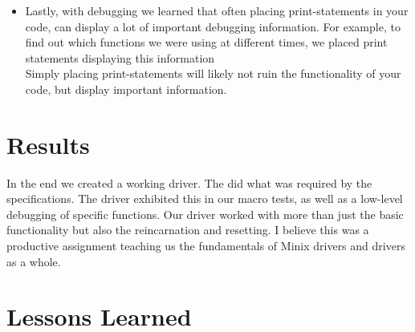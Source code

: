 \documentclass[11pt]{article}
\begin{document}
\begin{itemize}
      \item Lastly, with debugging we learned that often placing
         print-statements in your code, can display a lot of important
         debugging information. For example, to find out which functions we
         were using at different times, we placed print statements displaying
         this information\\

         Simply placing print-statements will likely not ruin the functionality
         of your code, but display important information.

   \end{itemize}



   \vspace{-5mm}
\section{Results}
\begin{adjustwidth}{.2in}{}{

   In the end we created a working driver. The did what was required by the
      specifications. The driver exhibited this in our macro tests, as well as
      a low-level debugging of specific functions. Our driver worked with more
      than just the basic functionality but also the reincarnation and
      resetting. I believe this was a productive assignment teaching us the
      fundamentals of Minix drivers and drivers as a whole.

}\end{adjustwidth}

\section{Lessons Learned}
\end{document}
